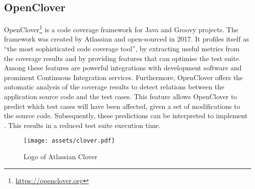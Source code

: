 
\subsection{OpenClover}
OpenClover\footnote{\url{https://openclover.org}} is a code coverage framework for Java and Groovy projects. The framework was created by Atlassian and open-sourced in 2017. It profiles itself as ``the most sophisticated code coverage tool'', by extracting useful metrics from the coverage results and by providing features that can optimise the test suite. Among these features are powerful integrations with development software and prominent Continuous Integration services. Furthermore, OpenClover offers the automatic analysis of the coverage results to detect relations between the application source code and the test cases. This feature allows OpenClover to predict which test cases will have been affected, given a set of modifications to the source code. Subsequently, these predictions can be interpreted to implement \tsm{}. This results in a reduced test suite execution time.

\begin{figure}[htbp!]
	\centering
	\texttt{[image: assets/clover.pdf]}
	\caption{Logo of Atlassian Clover}
\end{figure}